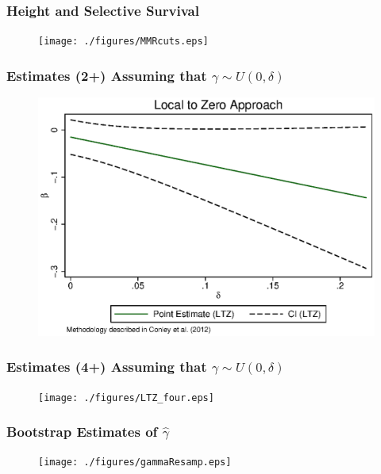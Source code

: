 \documentclass[10pt,letterpaper,subeqn]{beamer}
\begin{document}
\begin{frame}[label=MMRcuts]
\frametitle{Height and Selective Survival}
\begin{figure}[htpb!]
\centering
  \texttt{[image: ./figures/MMRcuts.eps]}
\end{figure}
\hyperlink{MMRselec}{}
\end{frame}


\begin{frame}[label=two]
\frametitle{Estimates (2+) Assuming that $\gamma \sim U(0,\delta)$}
\begin{figure}[htpb!]
\centering
  \includegraphics[scale=0.75]{./figures/LTZ_two.eps}
\end{figure}
\hyperlink{Conley3}{}
\end{frame}

\begin{frame}[label=four]
\frametitle{Estimates (4+) Assuming that $\gamma \sim U(0,\delta)$}
\begin{figure}[htpb!]
\centering
  \texttt{[image: ./figures/LTZ\_four.eps]}
\end{figure}
\hyperlink{Conley3}{}
\end{frame}

\begin{frame}[label=gammaResamp]
\frametitle{Bootstrap Estimates of $\hat\gamma$}
\begin{figure}[htpb!]
\centering
  \texttt{[image: ./figures/gammaResamp.eps]}
\end{figure}
\hyperlink{gammaDiscuss}{}
\end{frame}
\end{document}
